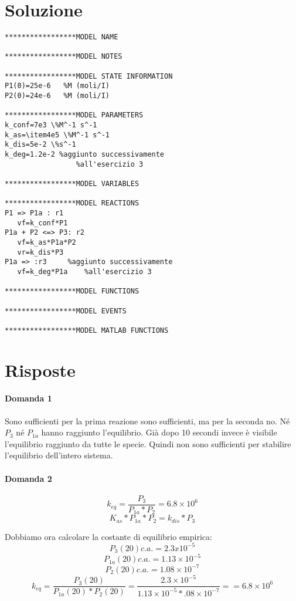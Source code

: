 \documentclass{article}
\begin{document}
\section*{Soluzione}
\begin{verbatim}
*****************MODEL NAME

*****************MODEL NOTES

*****************MODEL STATE INFORMATION
P1(0)=25e-6   %M (moli/I)
P2(0)=24e-6   %M (moli/I)

*****************MODEL PARAMETERS
k_conf=7e3 \%M^-1 s^-1
k_as=\item4e5 \%M^-1 s^-1
k_dis=5e-2 \%s^-1
k_deg=1.2e-2 %aggiunto successivamente
                 %all'esercizio 3

*****************MODEL VARIABLES

*****************MODEL REACTIONS
P1 => P1a : r1
   vf=k_conf*P1
P1a + P2 <=> P3: r2
   vf=k_as*P1a*P2
   vr=k_dis*P3
P1a => :r3     %aggiunto successivamente
   vf=k_deg*P1a    %all'esercizio 3

*****************MODEL FUNCTIONS

*****************MODEL EVENTS

*****************MODEL MATLAB FUNCTIONS
\end{verbatim}
\section*{Risposte}
\paragraph{Domanda 1}
Sono sufficienti per la prima reazione sono sufficienti, ma per la seconda no. Né $P_3$ né $P_{1a}$ hanno raggiunto l'equilibrio. Già dopo 10 secondi invece è visibile l'equilibrio raggiunto da tutte le specie.
Quindi non sono sufficienti per stabilire l'equilibrio dell'intero sistema.
\paragraph{Domanda 2}
$$k_{eq} = \frac{ P_3}{P_{1a}*P_2} = 6.8 \times 10^6$$
$$K_{as}*P_{1a}*P_2 = k_{dis}*P_3$$

Dobbiamo ora calcolare la costante di equilibrio empirica:\\
$$P_3(20) c.a. = 2.3x10^{-5}$$
$$P_{1a}(20) c.a. = 1.13 \times 10^{-5}$$
$$P_2(20) c.a. = 1.08 \times 10^{-7}$$
$$k_{eq} = \frac{ P_3(20)}{P_{1a}(20)*P_2(20)} = \frac{2.3 \times 10^{-5}}{1.13 \times 10^{-5}*.08 \times 10^{-7}} == 6.8 \times 10^{6}$$
\end{document}
